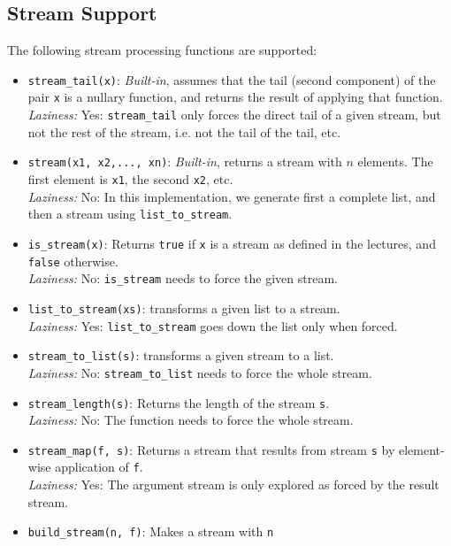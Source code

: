 \subsection*{Stream Support}

The following stream processing functions are supported:

\begin{itemize}
\item \lstinline{stream_tail(x)}: \textit{Built-in}, assumes that the tail (second component) of the
  pair \lstinline{x} is a nullary function, and returns the result of
  applying that function.\\
\emph{Laziness:}  Yes: \lstinline{stream_tail} only forces the direct tail of a given
stream,
but not the rest of the stream, i.e. not the tail of the tail, etc.
\item \lstinline{stream(x1, x2,..., xn)}: \textit{Built-in}, returns a stream with $n$ elements. The
first element is \lstinline{x1}, the second \lstinline{x2}, etc.\\
\emph{Laziness:}  No: In this implementation, we generate first a
           complete list, and then a stream using \lstinline{list_to_stream}.
\item \lstinline{is_stream(x)}: Returns \lstinline{true} if
  \lstinline{x} is a stream as defined in the lectures, and
  \lstinline{false} otherwise.\\
\emph{Laziness:}  No: \lstinline{is_stream} needs to force the given stream.
\item \lstinline{list_to_stream(xs)}: transforms a given list to a stream.\\
\emph{Laziness:}  Yes: \lstinline{list_to_stream} goes down the list only when forced.
\item \lstinline{stream_to_list(s)}: transforms a given stream to a list.\\
\emph{Laziness:}  No: \lstinline{stream_to_list} needs to force the whole stream.
\item \lstinline{stream_length(s)}: Returns the length of the stream
  \lstinline{s}.\\
\emph{Laziness:}  No: The function needs to force the whole stream.
\item \lstinline{stream_map(f, s)}: Returns a stream that results from stream
  \lstinline{s} by element-wise application of \lstinline{f}.\\
\emph{Laziness:}  Yes: The argument stream is only explored as forced by
           the result stream.
\item \lstinline{build_stream(n, f)}: Makes a stream with \lstinline{n}

\end{itemize}
